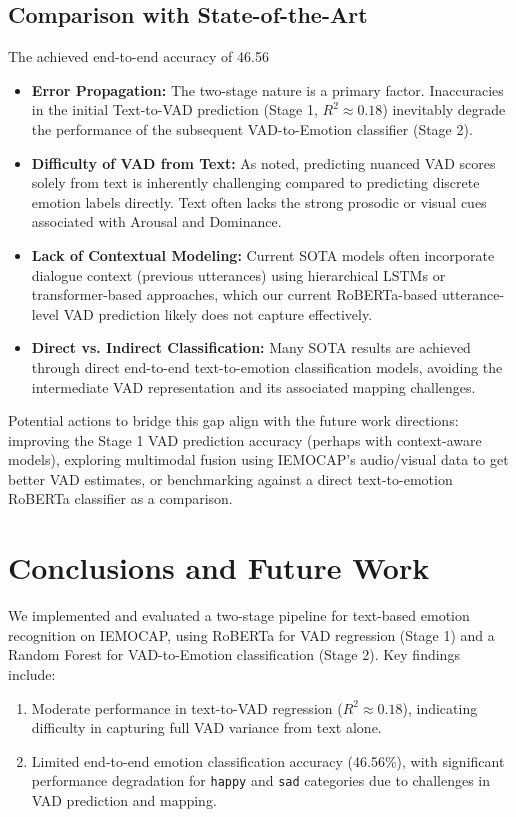 \documentclass[conference]{IEEEtran}
\begin{document}
\subsection{Comparison with State-of-the-Art}
The achieved end-to-end accuracy of 46.56%
\begin{itemize}
    \item \textbf{Error Propagation:} The two-stage nature is a primary factor. Inaccuracies in the initial Text-to-VAD prediction (Stage 1, $R^2 \approx 0.18$) inevitably degrade the performance of the subsequent VAD-to-Emotion classifier (Stage 2).
    \item \textbf{Difficulty of VAD from Text:} As noted, predicting nuanced VAD scores solely from text is inherently challenging compared to predicting discrete emotion labels directly. Text often lacks the strong prosodic or visual cues associated with Arousal and Dominance.
    \item \textbf{Lack of Contextual Modeling:} Current SOTA models often incorporate dialogue context (previous utterances) using hierarchical LSTMs or transformer-based approaches, which our current RoBERTa-based utterance-level VAD prediction likely does not capture effectively.
    \item \textbf{Direct vs. Indirect Classification:} Many SOTA results are achieved through direct end-to-end text-to-emotion classification models, avoiding the intermediate VAD representation and its associated mapping challenges.
\end{itemize}

Potential actions to bridge this gap align with the future work directions: improving the Stage 1 VAD prediction accuracy (perhaps with context-aware models), exploring multimodal fusion using IEMOCAP's audio/visual data to get better VAD estimates, or benchmarking against a direct text-to-emotion RoBERTa classifier as a comparison.

\section{Conclusions and Future Work}
We implemented and evaluated a two-stage pipeline for text-based emotion recognition on IEMOCAP, using RoBERTa for VAD regression (Stage 1) and a Random Forest for VAD-to-Emotion classification (Stage 2). Key findings include:
\begin{enumerate}
    \item Moderate performance in text-to-VAD regression ($R^2 \approx 0.18$), indicating difficulty in capturing full VAD variance from text alone.
    \item Limited end-to-end emotion classification accuracy (46.56\%), with significant performance degradation for \texttt{happy} and \texttt{sad} categories due to challenges in VAD prediction and mapping.
\end{enumerate}
\end{document}
